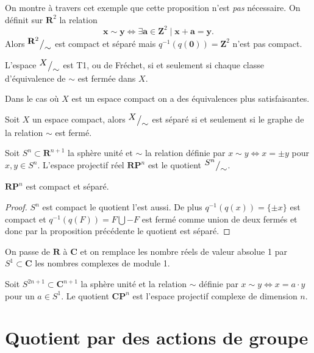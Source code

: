 \documentclass[main.tex]{subfiles}
\begin{document}
	\begin{example} On montre à travers cet exemple que cette proposition n'est \emph{pas} nécessaire. On définit sur $\mathbf{R}^2$ la relation  \[
		\textbf{x} \sim \textbf{y} \iff \exists \textbf{a} \in \mathbf{Z}^2 \;|\; \textbf{x} + \textbf{a} = \textbf{y}
	.\] Alors ${^{\textstyle \mathbf{R}^2}\big/_{\textstyle \sim}}$ est compact et séparé mais $q^{-1}(q(\textbf{0})) = \mathbf{Z}^2$ n'est pas compact.
	\end{example}

	\begin{prop}
		L'espace ${^{\textstyle X}\big/_{\textstyle \sim}}$ est T1, ou de Fréchet, si et seulement si chaque classe d'équivalence de $\sim$ est fermée dans $X$.
	\end{prop}
	
	Dans le cas où $X$ est un espace compact on a des équivalences plus satisfaisantes.
	 \begin{prop}
		Soit $X$ un espace compact, alors ${^{\textstyle X}\big/_{\textstyle \sim}}$ est séparé si et seulement si le graphe de la relation $\sim$ est fermé.
	\end{prop}

	\begin{definition}
		Soit $S^n \subset \mathbf{R}^{n+1}$ la sphère unité et $\sim$ la relation définie par $x \sim y \iff x = \pm y$ pour $x,y \in S^n$. L'espace projectif réel $\mathbf{RP}^n$ est le quotient  ${^{\textstyle S^n}\big/_{\textstyle \sim}}$.
	\end{definition}
	\begin{prop}
		$\mathbf{RP}^n$ est compact et séparé.
	\end{prop}
	\begin{proof}
		$S^n$ est compact le quotient l'est aussi. De plus $q^{-1}(q(x)) = \{\pm x\}$ est compact et $q^{-1}(q(F)) = F \bigcup -F$ est fermé comme union de deux fermés et donc par la proposition précédente le quotient est séparé.
	\end{proof}
	On passe de $\mathbf{R}$ à  $\mathbf{C}$ et on remplace les nombre réels de valeur absolue 1 par  $S^1 \subset \mathbf{C}$ les nombres complexes de module 1.

	\begin{definition}
		Soit $S^{2n+1} \subset \mathbf{C}^{n+1}$ la sphère unité et la relation $\sim$ définie par  $x \sim y  \iff x = a\cdot y$ pour un $a \in S^1$. Le quotient $\mathbf{CP}^n$ est l'espace projectif complexe de dimension  $n$.
	\end{definition}

	\section{Quotient par des actions de groupe}
\end{document}
